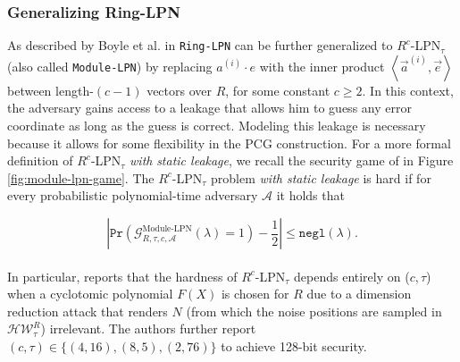 \subsubsection{Generalizing Ring-LPN}
As described by Boyle et al. in \cite{boyle2020efficient} \texttt{Ring-LPN} can be further generalized to $R^{c}$-LPN$_{\tau}$ (also called \texttt{Module-LPN}) by replacing $a^{(i)} \cdot e$ with the inner product $\left\langle\vec{a}^{(i)}, \vec{e}\right\rangle$ between length-$(c-1)$ vectors over $R$, for some constant $c \geq 2$. In this context, the adversary gains access to a leakage that allows him to guess any error coordinate as long as the guess is correct. Modeling this leakage is necessary because it allows for some flexibility in the PCG construction. For a more formal definition of $R^{c}$-LPN$_{\tau}$ \textit{with} \textit{static leakage}, we recall the security game of \cite{abram2022low} in Figure \ref{fig:module-lpn-game}. The $R^{c}$-LPN$_{\tau}$ problem \textit{with static leakage} is hard if for every probabilistic polynomial-time adversary $\mathcal{A}$ it holds that

$$
\left|\texttt{Pr}\left(\mathcal{G}_{R, \tau, c,\mathcal{A}}^{\text{Module-LPN}}(\lambda) = 1\right) - \frac{1}{2}\right|\leq \texttt{negl}(\lambda) .
$$
\\
In particular, \cite{boyle2020efficient} reports that the hardness of $R^{c}$-LPN$_{\tau}$ depends entirely on ($c,\tau$) when a cyclotomic polynomial $F(X)$ is chosen for $R$ due to a dimension reduction attack that renders $N$ (from which the noise positions are sampled in $\mathcal{H W}_{\tau}^{R}$) irrelevant. The authors further report $(c,\tau) \in \{(4,16),(8,5),(2,76)\}$ to achieve 128-bit security.

